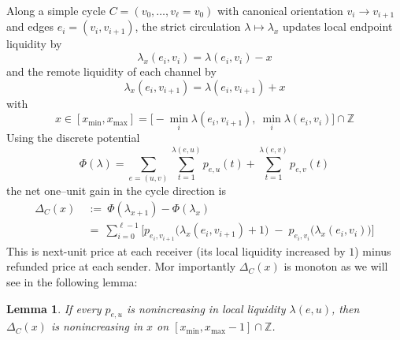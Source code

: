 \documentclass[10pt,twocolumn]{article}
\newtheorem{lemma}[theorem]{Lemma}
\begin{document}
Along a simple cycle $C=(v_0,\dots,v_\ell=v_0)$ with canonical orientation $v_i\!\to\!v_{i+1}$ and edges $e_i=(v_i,v_{i+1})$,
the strict circulation $\lambda\mapsto\lambda_x$ updates local endpoint liquidity by
\[
\lambda_x(e_i,v_i)=\lambda(e_i,v_i)-x
\]
and the remote liquidity of each channel by
\[
\lambda_x(e_i,v_{i+1})=\lambda(e_i,v_{i+1})+x
\]
with
\[x\in[x_{\min},x_{\max}]=\big[-\min_i \lambda(e_i,v_{i+1}),\ \min_i \lambda(e_i,v_i)\big]\cap\mathbb{Z}\]
Using the discrete potential
\[\Phi(\lambda)=\sum_{e=(u,v)}\sum_{t=1}^{\lambda(e,u)}p_{e,u}(t)+\sum_{t=1}^{\lambda(e,v)}p_{e,v}(t)
\]
the net one–unit gain in the cycle direction is
  \begin{align*}
\Delta_C(x)\ & :=\ \Phi(\lambda_{x+1})-\Phi(\lambda_x) \\
& =\ \sum_{i=0}^{\ell-1}\Big[p_{e_i,v_{i+1}}\!\big(\lambda_x(e_i,v_{i+1})+1\big)\;-\;p_{e_i,v_i}\!\big(\lambda_x(e_i,v_i)\big)\Big]
\label{eq:deltaC-orient}
\end{align*}
This is next-unit price at each receiver (its local liquidity increased by $1$) minus refunded price at each sender. Mor importantly $\Delta_C(x)$ is monoton as we will see in the following lemma: 

\begin{lemma}
If every $p_{e,u}$ is nonincreasing in local liquidity $\lambda(e,u)$, then $\Delta_C(x)$ is nonincreasing in $x$ on $[x_{\min},x_{\max}-1]\cap\mathbb{Z}$.
\end{lemma}
\end{document}
